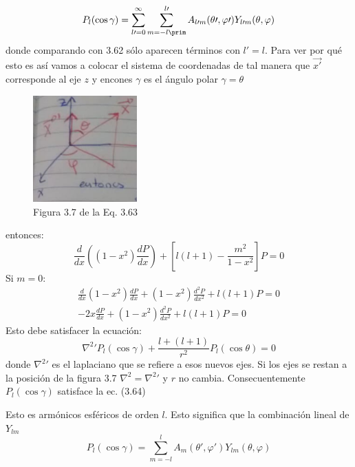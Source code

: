 \documentclass{article}
\begin{document}
\begin{equation}
P_l(\cos \gamma) = \sum_{l\prime = 0}^{\infty} \sum_{m = -l\prim}^{l\prime}A_{l\prime m}(\theta \prime, \varphi\prime) Y_{l\prime m} (\theta, \varphi)    
\end{equation}
donde comparando con 3.62 sólo aparecen términos con $l\prime = l$.  Para ver por qué esto es así vamos a colocar el sistema de coordenadas de tal manera que $\vec{x\prime}$ corresponde al eje $z$ y encones $\gamma$ es el ángulo polar $\gamma = \theta$


\begin{figure}[h]
\centering\includegraphics[width=4cm]{image5.png}
\caption{Figura 3.7 de la Eq. 3.63}
\end{figure}
entonces:
\begin{equation}
    \frac{d}{dx} \left ( (1-x^2) \frac{dP}{dx} \right ) + \left [ l(l+1) - \frac{m^2}{1-x^2}\right] P = 0
\end{equation}
Si $m = 0$:
\begin{equation}
\begin{gathered}
    \frac{d}{dx} (1 - x^2) \frac{dP}{dx} + (1 - x^2) \frac{d^2P}{dx^2} + l (l+1)P = 0 \\
    -2x\frac{dP}{dx} + (1 - x^2) \frac{d^2 P}{d x^2} + l(l+1)P=0
\end{gathered}
\end{equation}
Esto debe satisfacer la ecuación:
\begin{equation}
    \nabla^2 \prime P_l (\cos \gamma)+ \frac{l +(l+1)}{r^2} P_l(\cos \theta) = 0
\end{equation}
donde $\nabla^2 \prime$ es el laplaciano que se refiere a esos nuevos ejes. Si los ejes se restan a la posición de la figura 3.7 $\nabla^2 = \nabla ^2 \prime$ y $r$ no cambia. Consecuentemente $P_l(\cos \gamma)$ satisface la ec. (3.64)

Esto es armónicos esféricos de orden $l$. Esto significa que la combinación lineal de $Y_{lm}$
\begin{equation}
    P_l (\cos \gamma) = \sum_{m = -l}^{l} A_{m}(\theta\prime, \varphi\prime) Y_{lm}(\theta, \varphi)
\end{equation}
\end{document}
